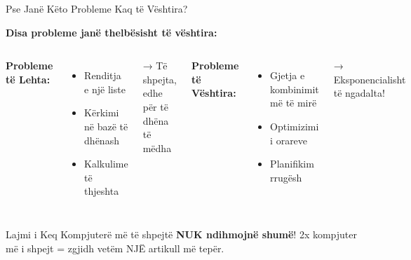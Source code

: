 \documentclass[aspectratio=169]{beamer}
\begin{document}
\begin{frame}{Pse Janë Këto Probleme Kaq të Vështira?}
\begin{center}
\textbf{Disa probleme janë thelbësisht të vështira:}
\end{center}

\vspace{0.3cm}

\begin{columns}
\textbf{Probleme të Lehta:}
\begin{itemize}
    \item Renditja e një liste
    \item Kërkimi në bazë të dhënash
    \item Kalkulime të thjeshta
\end{itemize}
\textcolor{aigreen}{→ Të shpejta, edhe për të dhëna të mëdha}

\vspace{0.5cm}
\textbf{Probleme të Vështira:}
\begin{itemize}
    \item Gjetja e kombinimit më të mirë
    \item Optimizimi i orareve
    \item Planifikim rrugësh
\end{itemize}
\textcolor{aired}{→ Eksponencialisht të ngadalta!}

\end{columns}

\vspace{0.5cm}
\begin{alertblock}{Lajmi i Keq}
Kompjuterë më të shpejtë \textbf{NUK ndihmojnë shumë}! 2x kompjuter më i shpejt = zgjidh vetëm NJË artikull më tepër.
\end{alertblock}
\end{frame}
\end{document}

